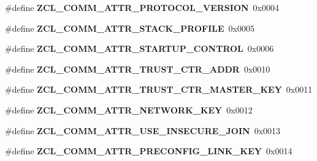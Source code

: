 \begin{DoxyCompactItemize}
\item 
\hypertarget{group__zcl__commissioning_ga0172ac434f01431ecc87395a87b129e7}{\#define {\bfseries Z\-C\-L\-\_\-\-C\-O\-M\-M\-\_\-\-A\-T\-T\-R\-\_\-\-P\-R\-O\-T\-O\-C\-O\-L\-\_\-\-V\-E\-R\-S\-I\-O\-N}~0x0004}\label{group__zcl__commissioning_ga0172ac434f01431ecc87395a87b129e7}

\item 
\hypertarget{group__zcl__commissioning_gad1b877a35188554b95bf9b2a89a57f8e}{\#define {\bfseries Z\-C\-L\-\_\-\-C\-O\-M\-M\-\_\-\-A\-T\-T\-R\-\_\-\-S\-T\-A\-C\-K\-\_\-\-P\-R\-O\-F\-I\-L\-E}~0x0005}\label{group__zcl__commissioning_gad1b877a35188554b95bf9b2a89a57f8e}

\item 
\hypertarget{group__zcl__commissioning_ga3fc4f9a3de48e3981e1a431fb890cfb6}{\#define {\bfseries Z\-C\-L\-\_\-\-C\-O\-M\-M\-\_\-\-A\-T\-T\-R\-\_\-\-S\-T\-A\-R\-T\-U\-P\-\_\-\-C\-O\-N\-T\-R\-O\-L}~0x0006}\label{group__zcl__commissioning_ga3fc4f9a3de48e3981e1a431fb890cfb6}

\item 
\hypertarget{group__zcl__commissioning_ga2b419dd89f6e6772c5cdb61153e127ba}{\#define {\bfseries Z\-C\-L\-\_\-\-C\-O\-M\-M\-\_\-\-A\-T\-T\-R\-\_\-\-T\-R\-U\-S\-T\-\_\-\-C\-T\-R\-\_\-\-A\-D\-D\-R}~0x0010}\label{group__zcl__commissioning_ga2b419dd89f6e6772c5cdb61153e127ba}

\item 
\hypertarget{group__zcl__commissioning_ga8f40f278173d0b1133f6696649bd4041}{\#define {\bfseries Z\-C\-L\-\_\-\-C\-O\-M\-M\-\_\-\-A\-T\-T\-R\-\_\-\-T\-R\-U\-S\-T\-\_\-\-C\-T\-R\-\_\-\-M\-A\-S\-T\-E\-R\-\_\-\-K\-E\-Y}~0x0011}\label{group__zcl__commissioning_ga8f40f278173d0b1133f6696649bd4041}

\item 
\hypertarget{group__zcl__commissioning_gae25bcf9c8637bcc14c05fb30d6b4240e}{\#define {\bfseries Z\-C\-L\-\_\-\-C\-O\-M\-M\-\_\-\-A\-T\-T\-R\-\_\-\-N\-E\-T\-W\-O\-R\-K\-\_\-\-K\-E\-Y}~0x0012}\label{group__zcl__commissioning_gae25bcf9c8637bcc14c05fb30d6b4240e}

\item 
\hypertarget{group__zcl__commissioning_gad50561cfc5d52d9a1efad90ef9599527}{\#define {\bfseries Z\-C\-L\-\_\-\-C\-O\-M\-M\-\_\-\-A\-T\-T\-R\-\_\-\-U\-S\-E\-\_\-\-I\-N\-S\-E\-C\-U\-R\-E\-\_\-\-J\-O\-I\-N}~0x0013}\label{group__zcl__commissioning_gad50561cfc5d52d9a1efad90ef9599527}

\item 
\hypertarget{group__zcl__commissioning_gaf160e476884cd49d2155b236b2dc3c71}{\#define {\bfseries Z\-C\-L\-\_\-\-C\-O\-M\-M\-\_\-\-A\-T\-T\-R\-\_\-\-P\-R\-E\-C\-O\-N\-F\-I\-G\-\_\-\-L\-I\-N\-K\-\_\-\-K\-E\-Y}~0x0014}\label{group__zcl__commissioning_gaf160e476884cd49d2155b236b2dc3c71}


\end{DoxyCompactItemize}
